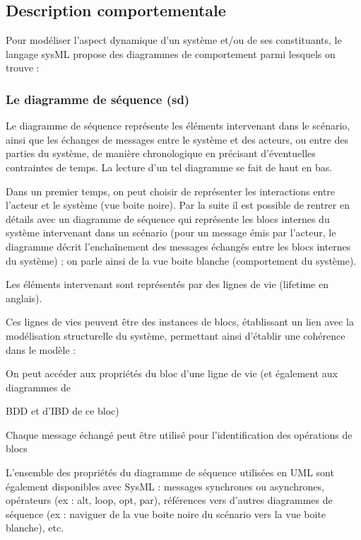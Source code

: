 \documentclass[12pt,a4paper]{report}
\begin{document}
\subsection{ Description comportementale}

\noindent \begin{flushleft}
	Pour mod\'{e}liser l'aspect dynamique d'un syst\`{e}me et/ou de ses constituants, le langage sysML propose des diagrammes de comportement parmi lesquels on trouve :
\end{flushleft}


\subsubsection{ Le diagramme de s\'{e}quence (sd)}

\noindent \begin{flushleft}
	Le diagramme de s\'{e}quence repr\'{e}sente les \'{e}l\'{e}ments intervenant dans le sc\'{e}nario, ainsi que les \'{e}changes de messages entre le syst\`{e}me et des acteurs, ou entre des parties du syst\`{e}me, de mani\`{e}re chronologique en pr\'{e}cisant d'\'{e}ventuelles contraintes de temps. La lecture d'un tel diagramme se fait de haut en bas.
	
	\noindent Dans un premier temps, on peut choisir de repr\'{e}senter les interactions entre l'acteur et le syst\`{e}me (vue boite noire). Par la suite il est possible de rentrer en d\'{e}tails avec un diagramme de s\'{e}quence qui repr\'{e}sente les blocs internes du syst\`{e}me intervenant dans un sc\'{e}nario (pour un message \'{e}mis par l'acteur, le diagramme d\'{e}crit l'encha\^{i}nement des messages \'{e}chang\'{e}s entre les blocs internes du syst\`{e}me) ; on parle ainsi de la vue boite blanche (comportement du syst\`{e}me).
	
	\noindent Les \'{e}l\'{e}ments intervenant sont repr\'{e}sent\'{e}s par des lignes de vie (lifetime en anglais).
	
	\noindent Ces lignes de vies peuvent \^{e}tre des instances de blocs, \'{e}tablissant un lien avec la mod\'{e}lisation structurelle du syst\`{e}me, permettant ainsi d'\'{e}tablir une coh\'{e}rence dans le mod\`{e}le :
	
	\noindent 
	
	\noindent On peut acc\'{e}der aux propri\'{e}t\'{e}s du bloc d'une ligne de vie (et \'{e}galement aux diagrammes de
	
	\noindent BDD et d'IBD de ce bloc)
	
	Chaque message \'{e}chang\'{e} peut \^{e}tre utilis\'{e} pour l'identification des op\'{e}rations de blocs
	
	\noindent L'ensemble des propri\'{e}t\'{e}s du diagramme de s\'{e}quence utilis\'{e}es en UML sont \'{e}galement disponibles avec SysML : messages synchrones ou asynchrones, op\'{e}rateurs (ex : alt, loop, opt, par), r\'{e}f\'{e}rences vers d'autres diagrammes de s\'{e}quence (ex : naviguer de la vue boite noire du sc\'{e}nario vers la vue boite blanche), etc. 
\end{flushleft}
\end{document}
